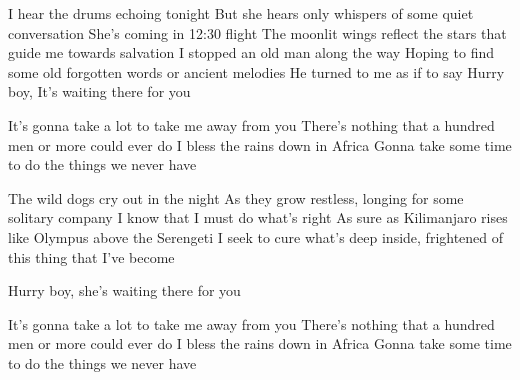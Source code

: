 \begin{verse*}
I hear the drums echoing tonight
But she hears only whispers of some quiet conversation
She's coming in 12:30 flight
The moonlit wings reflect the stars that guide me towards salvation
I stopped an old man along the way
Hoping to find some old forgotten words or ancient melodies
He turned to me as if to say
Hurry boy, It's waiting there for you
\end{verse*}

\begin{chorus}
It's gonna take a lot to take me away from you
There's nothing that a hundred men or more could ever do
I bless the rains down in Africa
Gonna take some time to do the things we never have
\end{chorus}

\begin{verse*}
The wild dogs cry out in the night
As they grow restless, longing for some solitary company
I know that I must do what's right
As sure as Kilimanjaro rises like Olympus above the Serengeti
I seek to cure what's deep inside,
frightened of this thing that I've become
\end{verse*}

\thechorus

\begin{verse*}
Hurry boy, she's waiting there for you
\end{verse*}

\begin{verse*}
It's gonna take a lot to take me away from you
There's nothing that a hundred men or more could ever do
I bless the rains down in Africa 
Gonna take some time to do the things we never have
\end{verse*}